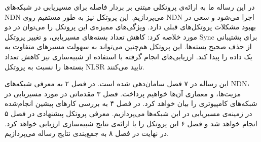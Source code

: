 در این رساله ما به ارائه‌ی پروتکلی مبتنی بر بردار فاصله برای مسیریابی در شبکه‌های NDN می‌پردازیم. این پروتکل نیز به طور مستقیم روی NDN اجرا می‌شود و سعی در بهبود مشکلات پروتکل‌های قبلی دارد. ویژگی‌های ممیزه‌ی این پروتکل را می‌توان در دو مورد خلاصه کرد: کاهش تعداد بسته‌های مسیریابی، و تغییر پروتکل Sync برای پشتیبانی از حذف صحیح بسته‌ها. این پروتکل هم‌چنین می‌تواند به سهولت مسیرهای متفاوت به یک داده را پیدا کند. ارزیابی‌های انجام گرفته با استفاده از شبیه‌سازی نیز کاهش تعداد بسته‌ها را نسبت به پروتکل NLSR تایید می‌کنند. 

این رساله در ۷ فصل سامان‌دهی شده است. در فصل ۲ به معرفی شبکه‌های NDN، مزیت‌ها، و معماری آن‌ها خواهیم پرداخت. فصل ۳ مقدماتی در مورد مسیریابی در شبکه‌های کامپیوتری را بیان خواهد کرد. در فصل ۴ به بررسی کارهای پیشین انجام‌شده در زمینه‌ی مسیریابی در این شبکه‌ها می‌پردازیم. معرفی پروتکل پیشنهادی در فصل ۵ انجام خواهد شد و فصل ۶ این پروتکل را با ارائه‌ی نتایج شبیه‌سازی ارزیابی خواهد کرد. در نهایت در فصل ۸ به جمع‌بندی نتایج رساله می‌پردازیم. 
